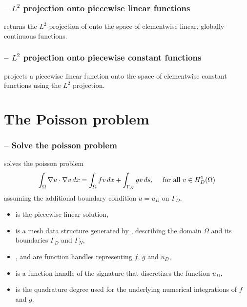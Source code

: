 \documentclass[twoside,11pt,a4paper]{article} %
\begin{document}
\subsubsection*{\texorpdfstring{ --}{} \texorpdfstring{$L^2$}{L2} projection onto piecewise linear functions}
 returns the $L^2$-projection of  onto the space of elementwise linear, globally continuous functions.
\subsubsection*{\texorpdfstring{ --}{} \texorpdfstring{$L^2$}{L2} projection onto piecewise constant functions}
 projects a piecewise linear function  onto the space of elementwise constant functions using the $L^2$ projection.



\section{The Poisson problem}
\subsubsection*{\texorpdfstring{ --}{} Solve the poisson problem}
 solves the poisson problem
\begin{align*}
\int_\Omega \nabla u \cdot \nabla v \,dx =  \int_\Omega f v \,dx + \int_{\Gamma_N} g v \,ds, \quad \text{ for all } v \in H_D^1(\Omega)
\end{align*}
assuming the additional boundary condition $u = u_D$ on $\Gamma_D$.
\begin{itemize}
 \item {} is the piecewise linear solution,
 \item {} is a mesh data structure generated by , describing the domain $\Omega$ and its boundaries $\Gamma_D$ and $\Gamma_N$,
 \item {},  and  are function handles representing $f$, $g$ and $u_D$,
 \item {} is a function handle of the signature  that discretizes the function $u_D$,
 \item {} is the quadrature degree used for the underlying numerical integrations of $f$ and $g$.
\end{itemize}
\end{document}
